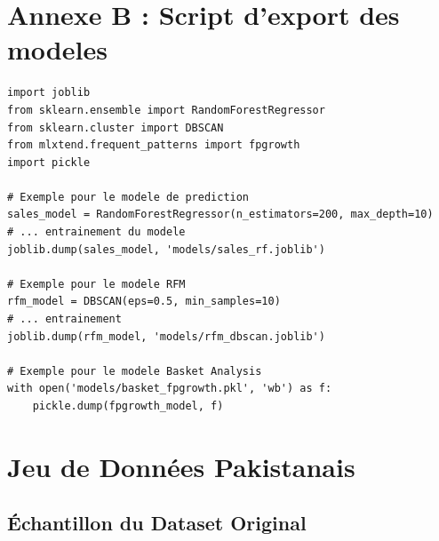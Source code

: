 \documentclass[a4paper,12pt]{article}
\begin{document}
\section*{Annexe B : Script d'export des modeles}

\begin{lstlisting}[style=pythonstyle, caption={export_models.py}]
import joblib
from sklearn.ensemble import RandomForestRegressor
from sklearn.cluster import DBSCAN
from mlxtend.frequent_patterns import fpgrowth
import pickle

# Exemple pour le modele de prediction
sales_model = RandomForestRegressor(n_estimators=200, max_depth=10)
# ... entrainement du modele
joblib.dump(sales_model, 'models/sales_rf.joblib')

# Exemple pour le modele RFM
rfm_model = DBSCAN(eps=0.5, min_samples=10)
# ... entrainement
joblib.dump(rfm_model, 'models/rfm_dbscan.joblib')

# Exemple pour le modele Basket Analysis
with open('models/basket_fpgrowth.pkl', 'wb') as f:
    pickle.dump(fpgrowth_model, f)
\end{lstlisting}



\section{Jeu de Données Pakistanais}
\subsection{Échantillon du Dataset Original}
\begin{table}[H]
    \centering
    \caption{Extrait des 5 premières lignes du dataset pakistanais}
    \caption*{\textit{Source : Dataset original Daraz Pakistan, 2023}}
    \label{tab:dataset_sample}
\end{table}
\end{document}
